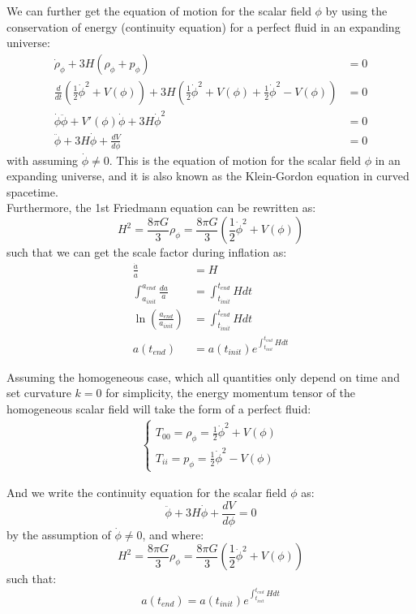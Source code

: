 \begin{foundation}
    We can further get the equation of motion for the scalar field $\phi$ by using the conservation of energy (continuity equation) for a perfect fluid in an expanding universe:
    \begin{align*}
       \dot{\rho}_\phi + 3 H (\rho_\phi + p_\phi) &= 0 \\
       \frac{d}{dt} \left( \frac{1}{2} \dot{\phi}^2 + V(\phi) \right) + 3 H \left( \frac{1}{2} \dot{\phi}^2 + V(\phi) + \frac{1}{2} \dot{\phi}^2 - V(\phi) \right) &= 0 \\
       \dot{\phi} \ddot{\phi} + V'(\phi) \dot{\phi} + 3 H \dot{\phi}^2 &= 0 \\
       \ddot{\phi} + 3 H \dot{\phi} + \frac{dV}{d\phi} &= 0
    \end{align*}
    with assuming $\dot{\phi} \neq 0$. This is the equation of motion for the scalar field $\phi$ in an expanding universe, and it is also known as the Klein-Gordon equation in curved spacetime. \\

    Furthermore, the 1st Friedmann equation can be rewritten as:
    \[
        H^2 = \frac{8 \pi G}{3} \rho_\phi = \frac{8 \pi G}{3} \left( \frac{1}{2} \dot{\phi}^2 + V(\phi) \right)
    \]
    such that we can get the scale factor during inflation as:
    \begin{align*}
        \frac{\dot{a}}{a} &= H\\
        \int_{a_{init}}^{a_{end}} \frac{da}{a} &= \int_{t_{init}}^{t_{end}} H dt \\
        \ln \left( \frac{a_{end}}{a_{init}} \right) &= \int_{t_{init}}^{t_{end}} H dt \\
        a(t_{end}) &= a(t_{init}) e^{\int_{t_{init}}^{t_{end}} H dt}
    \end{align*}
\end{foundation}

\begin{theory}
    Assuming the homogeneous case, which all quantities only depend on time and set curvature $k=0$ for simplicity, the energy momentum tensor of the homogeneous scalar field will take the form of a perfect fluid:
    \begin{align*}
        \begin{cases}
            T_{00} = \rho_\phi = \frac{1}{2} \dot{\phi}^2 + V(\phi) \\
            T_{ii} = p_\phi = \frac{1}{2} \dot{\phi}^2 - V(\phi)
        \end{cases}
    \end{align*}

    And we write the continuity equation for the scalar field $\phi$ as:
    \[
       \ddot{\phi} + 3 H \dot{\phi} + \frac{dV}{d\phi} = 0
    \]
    by the assumption of $\dot{\phi} \neq 0$, and where:
    \[
        H^2 = \frac{8 \pi G}{3} \rho_\phi = \frac{8 \pi G}{3} \left( \frac{1}{2} \dot{\phi}^2 + V(\phi) \right)
    \]
    such that:
    \[
        a(t_{end}) = a(t_{init}) e^{\int_{t_{init}}^{t_{end}} H dt}
    \]
\end{theory}

